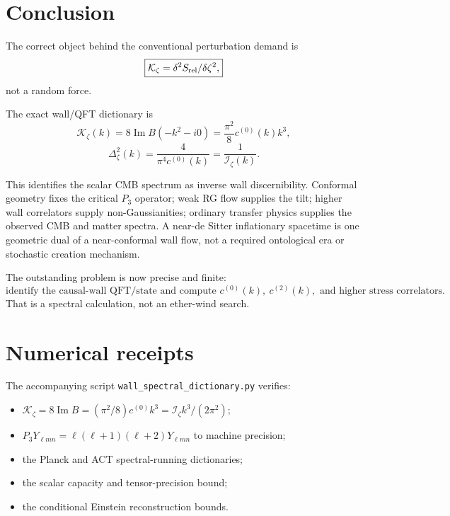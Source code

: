 \documentclass[11pt]{article}
\numberwithin{equation}{section}
\newcommand{\Iz}{\mathcal I_\zeta}
\newcommand{\Kz}{\mathcal K_\zeta}
\newcommand{\cz}{c^{(0)}}
\newcommand{\ct}{c^{(2)}}
\begin{document}
\section{Conclusion}

The correct object behind the conventional perturbation demand is
\begin{equation}
\boxed{\Kz=\delta^2S_{\rm rel}/\delta\zeta^2,}
\end{equation}
not a random force.

The exact wall/QFT dictionary is
\begin{equation}
\boxed{
\Kz(k)=8\operatorname{Im}B(-k^2-i0)=\frac{\pi^2}{8}\cz(k)k^3,}
\end{equation}
\begin{equation}
\boxed{
\Delta_\zeta^2(k)=\frac4{\pi^4\cz(k)}=\frac1{\Iz(k)}.}
\end{equation}

This identifies the scalar CMB spectrum as inverse wall discernibility. Conformal geometry fixes the critical $P_3$ operator; weak RG flow supplies the tilt; higher wall correlators supply non-Gaussianities; ordinary transfer physics supplies the observed CMB and matter spectra. A near-de Sitter inflationary spacetime is one geometric dual of a near-conformal wall flow, not a required ontological era or stochastic creation mechanism.

The outstanding problem is now precise and finite:
\begin{equation}
\boxed{
\text{identify the causal-wall QFT/state and compute }\cz(k),\ \ct(k),\text{ and higher stress correlators}.}
\end{equation}
That is a spectral calculation, not an ether-wind search.

\appendix
\section{Numerical receipts}

The accompanying script \texttt{wall\_spectral\_dictionary.py} verifies:
\begin{itemize}
\item $\Kz=8\operatorname{Im}B=(\pi^2/8)\cz k^3=\Iz k^3/(2\pi^2)$;
\item $P_3Y_{\ell mn}=\ell(\ell+1)(\ell+2)Y_{\ell mn}$ to machine precision;
\item the Planck and ACT spectral-running dictionaries;
\item the scalar capacity and tensor-precision bound;
\item the conditional Einstein reconstruction bounds.
\end{itemize}
\end{document}
